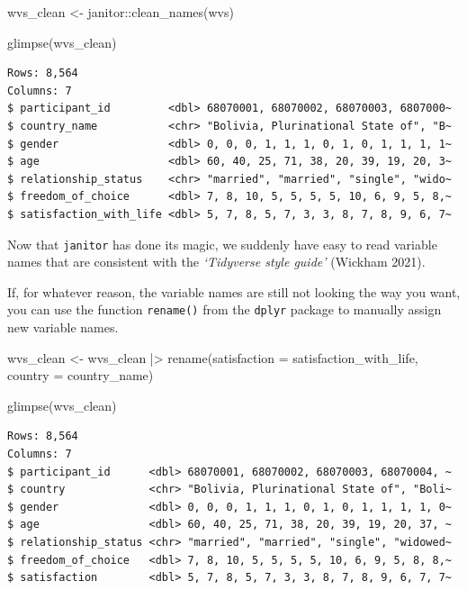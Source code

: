 \documentclass[
  letterpaper,
  DIV=11,
  numbers=noendperiod]{scrreprt}
\newenvironment{Shaded}{\begin{snugshade}}{\end{snugshade}}
\newcommand{\AttributeTok}[1]{\textcolor[rgb]{0.40,0.45,0.13}{#1}}
\newcommand{\FunctionTok}[1]{\textcolor[rgb]{0.28,0.35,0.67}{#1}}
\newcommand{\NormalTok}[1]{\textcolor[rgb]{0.00,0.23,0.31}{#1}}
\newcommand{\OtherTok}[1]{\textcolor[rgb]{0.00,0.23,0.31}{#1}}
\newcommand{\SpecialCharTok}[1]{\textcolor[rgb]{0.37,0.37,0.37}{#1}}
\begin{document}
\begin{Shaded}
\begin{Highlighting}[]
\NormalTok{wvs\_clean }\OtherTok{\textless{}{-}}\NormalTok{ janitor}\SpecialCharTok{::}\FunctionTok{clean\_names}\NormalTok{(wvs)}

\FunctionTok{glimpse}\NormalTok{(wvs\_clean)}
\end{Highlighting}
\end{Shaded}

\begin{verbatim}
Rows: 8,564
Columns: 7
$ participant_id         <dbl> 68070001, 68070002, 68070003, 6807000~
$ country_name           <chr> "Bolivia, Plurinational State of", "B~
$ gender                 <dbl> 0, 0, 0, 1, 1, 1, 0, 1, 0, 1, 1, 1, 1~
$ age                    <dbl> 60, 40, 25, 71, 38, 20, 39, 19, 20, 3~
$ relationship_status    <chr> "married", "married", "single", "wido~
$ freedom_of_choice      <dbl> 7, 8, 10, 5, 5, 5, 5, 10, 6, 9, 5, 8,~
$ satisfaction_with_life <dbl> 5, 7, 8, 5, 7, 3, 3, 8, 7, 8, 9, 6, 7~
\end{verbatim}

Now that \texttt{janitor} has done its magic, we suddenly have easy to
read variable names that are consistent with the \emph{`Tidyverse style
guide'} (Wickham 2021).

If, for whatever reason, the variable names are still not looking the
way you want, you can use the function \texttt{rename()} from the
\texttt{dplyr} package to manually assign new variable names.

\begin{Shaded}
\begin{Highlighting}[]
\NormalTok{wvs\_clean }\OtherTok{\textless{}{-}} 
\NormalTok{  wvs\_clean }\SpecialCharTok{|\textgreater{}}
  \FunctionTok{rename}\NormalTok{(}\AttributeTok{satisfaction =}\NormalTok{ satisfaction\_with\_life,}
         \AttributeTok{country =}\NormalTok{ country\_name)}

\FunctionTok{glimpse}\NormalTok{(wvs\_clean)}
\end{Highlighting}
\end{Shaded}

\begin{verbatim}
Rows: 8,564
Columns: 7
$ participant_id      <dbl> 68070001, 68070002, 68070003, 68070004, ~
$ country             <chr> "Bolivia, Plurinational State of", "Boli~
$ gender              <dbl> 0, 0, 0, 1, 1, 1, 0, 1, 0, 1, 1, 1, 1, 0~
$ age                 <dbl> 60, 40, 25, 71, 38, 20, 39, 19, 20, 37, ~
$ relationship_status <chr> "married", "married", "single", "widowed~
$ freedom_of_choice   <dbl> 7, 8, 10, 5, 5, 5, 5, 10, 6, 9, 5, 8, 8,~
$ satisfaction        <dbl> 5, 7, 8, 5, 7, 3, 3, 8, 7, 8, 9, 6, 7, 7~
\end{verbatim}
\end{document}
